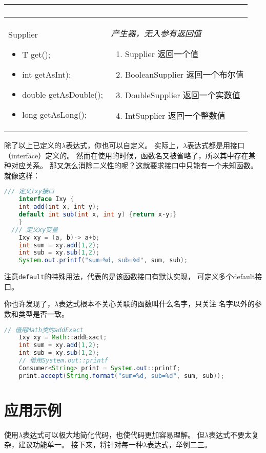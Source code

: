 \begin{longtable}{|p{4cm}|p{9cm}|}
\begin{enumerate}
	\end{enumerate} \\
	\hline
	Supplier 
	\begin{itemize}
		\small
		\setlength{\itemindent}{-1.2em}
		\setlength{\itemsep}{0pt}
		\item T get();
		\item int getAsInt);
		\item double getAsDouble();
		\item long getAsLong();
	\end{itemize} & \emph{产生器，无入参有返回值}
	\begin{enumerate}
		\setlength{\itemsep}{0pt}
		\small
		\item Supplier 返回一个值
		\item BooleanSupplier 返回一个布尔值
		\item DoubleSupplier 返回一个实数值
		\item IntSupplier 返回一个整数值
	\end{enumerate} \\
	\hline
\end{longtable}
\noindent
除了以上已定义的$\lambda$表达式，你也可以自定义。
实际上，$\lambda$表达式都是用接口（interface）定义的。
然而在使用的时候，函数名又被省略了，所以其中存在某种对应关系。
那又怎么消除二义性的呢？这就要求接口中只能有一个未知函数。
就像这样：

\begin{lstlisting}[language=java]
	/// 定义Ixy接口
	interface Ixy {
    int add(int x, int y);
    default int sub(int x, int y) {return x-y;}
	}
  /// 定义xy变量
	Ixy xy = (a, b)-> a+b;
	int sum = xy.add(1,2);
	int sub = xy.sub(1,2);
	System.out.printf("sum=%d, sub=%d", sum, sub);
\end{lstlisting}
\noindent
注意\lstinline{default}的特殊用法，代表的是该函数接口有默认实现，
可定义多个default接口。

你也许发现了，$\lambda$表达式根本不关心关联的函数叫什么名字，只关注
名字以外的参数和类型是否一致。
\begin{lstlisting}[language=java]
	// 借用Math类的addExact
	Ixy xy = Math::addExact;
	int sum = xy.add(1,2);
	int sub = xy.sub(1,2);
	// 借用System.out::printf
	Consumer<String> print = System.out::printf;
	print.accept(String.format("sum=%d, sub=%d", sum, sub));
\end{lstlisting}

\section{应用示例}
使用$\lambda$表达式可以极大地简化代码，也使代码更加容易理解。
但$\lambda$表达式不要太复杂，建议功能单一。
接下来，将针对每一种$\lambda$表达式，举例二三。

